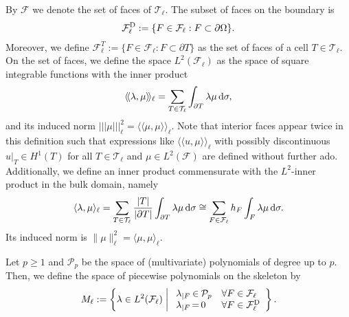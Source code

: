 \documentclass[a4paper, english, 12pt, reqno, draft]{amsart}
\theoremstyle{definition}
\theoremstyle{remark}
\numberwithin{equation}{section}
\newcommand{\elem}{\ensuremath{T}}
\newcommand{\mesh}{\ensuremath{\mathcal T}}
\newcommand{\faceSet}{\ensuremath{\mathcal F}}
\newcommand{\faceSetDir}{\ensuremath{\mathcal F^\textup D}}
\newcommand{\face}{\ensuremath{F}}
\newcommand{\skeletalSpace}{\ensuremath{M}}
\newcommand{\polynomials}{\ensuremath{\mathcal P}}
\newcommand{\level}{\ensuremath{\ell}}
\newcommand{\ds}{\ensuremath{\, \textup d \sigma}}
\newcommand{\llangle}{\ensuremath{\langle \! \langle}}
\newcommand{\rrangle}{\ensuremath{\rangle \! \rangle}}
\newcommand{\nnorm}{\ensuremath{\vert \! \vert \! \vert}}
\begin{document}
By $\faceSet$ we denote the set of faces of $\mesh_\level$.
The subset of faces on the boundary is
\begin{gather}
  \faceSetDir_\level := \{\face \in \faceSet_\level : \face \subset \partial \Omega \}.
\end{gather}
Moreover, we define
$\faceSet^\elem_\level := \{ \face \in \faceSet_\level : \face \subset
\partial \elem \}$ as the set of faces of a cell $\elem\in\mesh_\level$.  On the set of faces, we define the space $L^2(\faceSet_\ell)$ as the space of
square integrable functions with the inner product
\begin{gather}
  \llangle \lambda, \mu \rrangle_\level = \sum_{\elem \in \mesh_\level} \int_{\partial \elem} \lambda\mu\ds,
\end{gather}
and its induced norm
$\nnorm \mu \nnorm^2_\level = \llangle \mu, \mu
\rrangle_\level$. Note that interior faces appear twice in this definition such that expressions like $\llangle u, \mu \rrangle_\level$ with possibly discontinuous $u|_{\elem} \in H^1(\elem)$ for all $\elem \in \mesh_\level$ and $\mu \in L^2(\faceSet)$ are defined without further ado. Additionally, we define an inner product
commensurate with the $L^2$-inner product in the bulk domain, namely
\begin{gather}
  \langle \lambda, \mu \rangle_\level
  = \sum_{\elem \in \mesh_\level} \frac{|\elem|}{|\partial \elem|}
  \int_{\partial \elem} \lambda \mu \ds \cong \sum_{\face \in \faceSet_\level} h_\face
  \int_{\face} \lambda \mu \ds.
\end{gather}
Its induced norm is $ \| \mu \|^2_\level = \langle \mu, \mu \rangle_\level$.

Let $p\ge 1$ and $\polynomials_p$ be the space of (multivariate)
polynomials of degree up to $p$. Then, we define the space of piecewise
polynomials on the skeleton by
\begin{gather}
  \label{EQ:skeletal_space}
  \skeletalSpace_\level := \left\{ \lambda \in L^2(\faceSet_\level) \;\middle|\;
    \begin{array}{r@{\,}c@{\,}ll}
  \lambda_{|\face} &\in& \polynomials_p & \forall \face \in \faceSet_\level\\
  \lambda_{|\face} &=& 0 & \forall \face \in \faceSetDir_\level    
    \end{array}
  \right\}.
\end{gather}
\end{document}
